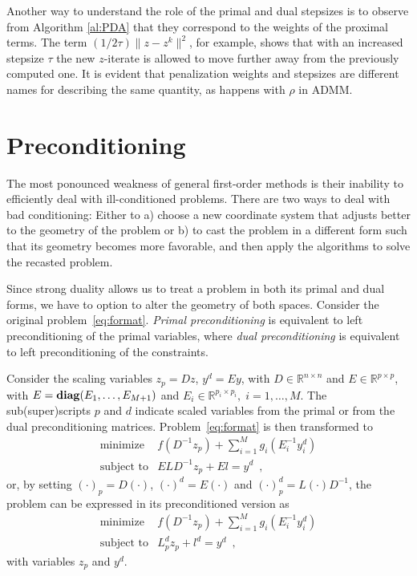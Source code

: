 \documentclass[openany]{now}
\newcommand{\reals}{{\mathbb R}}
\newcommand{\diag}{\mathop{\bf diag}}
\begin{document}
\begin{remark}
 Another way to understand the role of the primal and dual stepsizes is to observe from Algorithm \ref{al:PDA} that they correspond to the weights of the proximal terms. The term $(1/2\tau)\|z-z^k\|^2$, for example, shows that with an increased stepsize $\tau$ the new $z$-iterate is allowed to move further away from the previously computed one. It is evident that penalization weights and stepsizes are different names for describing the same quantity, as happens with $\rho$ in ADMM. 
\end{remark}
\fi

\section{Preconditioning} 

The most ponounced weakness of general first-order methods is their inability to efficiently deal with ill-conditioned problems. There are two ways to deal with bad conditioning: Either to a) choose a new coordinate system that adjusts better to the geometry of the problem or b) to cast the problem in a different form such that its geometry becomes more favorable, and then apply the algorithms to solve the recasted problem.

Since strong duality allows us to treat a problem in both its primal and dual forms, we have to option to alter the geometry of both spaces. Consider the original problem~\eqref{eq:format}. \emph{Primal preconditioning} is equivalent to left preconditioning of the primal variables, where \emph{dual preconditioning} is equivalent to left preconditioning of the constraints. 

Consider the scaling variables $z_p=Dz$, $y^d=Ey$, with $D\in\reals^{n\times n}$ and $E\in\reals^{p\times p}$, with $E=\diag(E_1,\ldots,E_{M+1})$ and $E_i\in\reals^{p_i\times p_i}, \; i=1,\ldots,M$. The sub(super)scripts $p$ and $d$ indicate scaled variables from the primal or from the dual preconditioning matrices. Problem~\eqref{eq:format} is then transformed to 
\begin{equation}   
\begin{array}{ll}
  \mbox{minimize} & f(D^{-1}z_p) + \sum\limits_{i=1}^M g_i(E_i^{-1}y^d_i) \\
  \mbox{subject to} & ELD^{-1}z_p + El = y^d\enspace,
\end{array}
\end{equation}
or, by setting $(\cdot)_p=D(\cdot)$, $(\cdot)^d=E(\cdot)$ and $(\cdot)_p^d=L(\cdot)D^{-1}$, the problem can be expressed in its preconditioned version as
\begin{equation}   
\label{eq:prec_format}
\begin{array}{ll}
  \mbox{minimize} & f(D^{-1}z_p) + \sum\limits_{i=1}^M g_i(E_i^{-1}y^d_i) \\
  \mbox{subject to} & L_p^dz_p + l^d = y^d\enspace, \tag{PrecP} 
\end{array}
\end{equation}
with variables $z_p$ and $y^d$.
\end{document}
